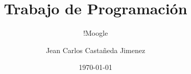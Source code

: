 \documentclass{beamer}
\title{Trabajo de Programación}
\subtitle{!Moogle}
\author{Jean Carlos Castañeda Jimenez}
\institute{Facultad MATCOM - Universidad de La Habana}
\date{\today}
\begin{document}
\begin{frame}
    \titlepage
\end{frame}
\end{document}
